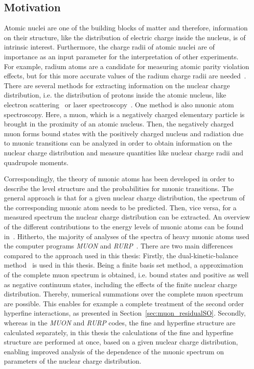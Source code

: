 \subsection{Motivation}
\label{sec:muon_motivation}
Atomic nuclei are one of the building blocks of matter and therefore, information on their structure, like the distribution of electric charge inside the nucleus, is of intrinsic interest. Furthermore, the charge radii of atomic nuclei are of importance as an input parameter for the interpretation of other experiments. For example, radium atoms are a candidate for measuring atomic parity violation effects, but for this more accurate values of the radium charge radii are needed~\cite{wansbeek2012}.
There are several methods for extracting information on the nuclear charge distribution, i.e. the distribution of protons inside the atomic nucleus, like electron scattering~\cite{devries1987} or laser spectroscopy~\cite{wang2004,dewitte2007,mueller2007}. One method is also muonic atom spectroscopy. Here, a muon, which is a negatively charged elementary particle is brought in the proximity of an atomic nucleus. Then, the negatively charged muon forms bound states with the positively charged nucleus and radiation due to muonic transitions can be analyzed in order to obtain information on the nuclear charge distribution and measure quantities like nuclear charge radii and quadrupole moments.

Correspondingly, the theory of muonic atoms has been developed in order to describe the level structure and the probabilities for muonic transitions. The general approach is that for a given nuclear charge distribution, the spectrum of the corresponding muonic atom needs to be predicted. Then, vice versa, for a measured spectrum the nuclear charge distribution can be extracted. An overview of the different contributions to the energy levels of muonic atoms can be found in~\cite{BorieRinker1982}. Hitherto, the majority of analyses of the spectra of heavy muonic atoms used the computer programs \textit{MUON} and \textit{RURP}~\cite{rinker1979}. There are two main differences compared to the approach used in this thesis:
Firstly, the dual-kinetic-balance method~\cite{Shabaev2004} is used in this thesis. Being a finite basis set method, a approximation of the complete muon spectrum is obtained, i.e. bound states and positive as well as negative continuum states, including the effects of the finite nuclear charge distribution. Thereby, numerical summations over the complete muon spectrum are possible. This enables for example a complete treatment of the second order hyperfine interactions, as presented in Section~\ref{sec:muon_residualSO}.
Secondly, whereas in the \textit{MUON} and \textit{RURP} codes, the fine and hyperfine structure are calculated separately, in this thesis the calculations of the fine and hyperfine structure are performed at once, based on a given nuclear charge distribution, enabling improved analysis of the dependence of the muonic spectrum on parameters of the nuclear charge distribution.


